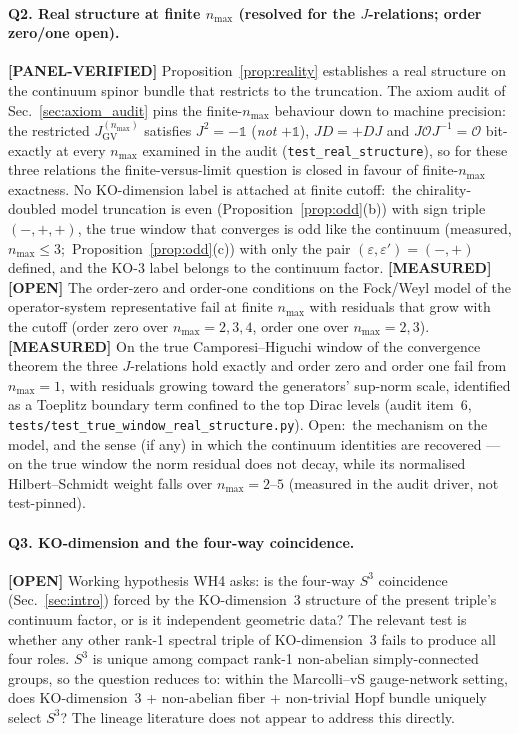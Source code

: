 \documentclass[11pt]{article}
\begin{document}
\paragraph{Q2.  Real structure at finite $n_{\max}$ (resolved for the
$J$-relations; order zero/one open).}
\textbf{[PANEL-VERIFIED]}
Proposition~\ref{prop:reality} establishes a real structure on the
continuum spinor bundle that restricts to the truncation.  The axiom
audit of Sec.~\ref{sec:axiom_audit} pins the finite-$n_{\max}$ behaviour
down to machine precision: the restricted $J_{\mathrm{GV}}^{(n_{\max})}$
satisfies $J^2 = -\mathbb{1}$ (\emph{not} $+\mathbb{1}$), $JD = +DJ$ and
$J\mathcal{O}J^{-1} = \mathcal{O}$ bit-exactly at every $n_{\max}$
examined in the audit (\texttt{test\_real\_structure}), so for these
three relations the finite-versus-limit question is closed in favour of
finite-$n_{\max}$ exactness.  No KO-dimension label is attached at
finite cutoff:\ the chirality-doubled model truncation is even
(Proposition~\ref{prop:odd}(b)) with sign triple $(-, +, +)$, the true
window that converges is odd like the continuum (measured,
$n_{\max} \le 3$;\ Proposition~\ref{prop:odd}(c)) with only the pair
$(\varepsilon, \varepsilon') = (-, +)$ defined, and the KO-3 label
belongs to the continuum factor.  \textbf{[MEASURED]}
\textbf{[OPEN]} The order-zero and order-one conditions on the
Fock/Weyl model of the operator-system representative fail at finite
$n_{\max}$ with residuals that grow with the cutoff (order zero over
$n_{\max} = 2, 3, 4$, order one over $n_{\max} = 2, 3$).
\textbf{[MEASURED]} On the true Camporesi--Higuchi window of the
convergence theorem the three $J$-relations hold exactly and order zero
and order one fail from $n_{\max} = 1$, with residuals growing toward
the generators' sup-norm scale, identified as a Toeplitz boundary term
confined to the top Dirac levels (audit item~6,
\texttt{tests/test\_true\_window\_real\_structure.py}).  Open:\ the
mechanism on the model, and the sense (if any) in which the continuum
identities are recovered --- on the true window the norm residual does
not decay, while its normalised Hilbert--Schmidt weight falls over
$n_{\max} = 2$--$5$ (measured in the audit driver, not test-pinned).

\paragraph{Q3.  KO-dimension and the four-way coincidence.}  \textbf{[OPEN]}  Working
hypothesis WH4 asks: is the four-way $S^3$ coincidence (Sec.~\ref{sec:intro})
forced by the $\mathrm{KO}$-dimension~$3$ structure of the present
triple's continuum factor, or is it independent geometric data?  The relevant test is
whether any other rank-1 spectral triple of $\mathrm{KO}$-dimension~3
fails to produce all four roles.  $S^3$ is unique among compact rank-1
non-abelian simply-connected groups, so the question reduces to:
within the Marcolli--vS gauge-network setting, does
$\mathrm{KO}$-dimension~3 + non-abelian fiber + non-trivial Hopf
bundle uniquely select $S^3$?  The lineage literature does not
appear to address this directly.
\end{document}
